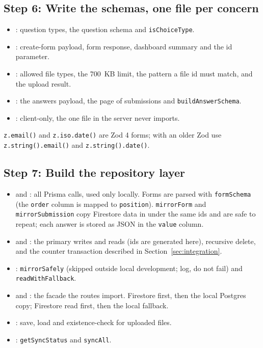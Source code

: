 \documentclass[11pt,a4paper]{article}
\begin{document}
\subsection*{Step 6: Write the schemas, one file per concern}
\begin{itemize}
  \item {}: question types, the question schema and \texttt{isChoiceType}.
  \item {}: create-form payload, form response, dashboard summary and the id parameter.
  \item {}: allowed file types, the 700~KB limit, the pattern a file id must match, and the upload result.
  \item {}: the answers payload, the page of submissions and \texttt{buildAnswerSchema}.
  \item {}: client-only, the one file in  the server never imports.
\end{itemize}
\texttt{z.email()} and \texttt{z.iso.date()} are Zod 4 forms; with an older Zod use \texttt{z.string().email()} and \texttt{z.string().date()}.

\subsection*{Step 7: Build the repository layer}
\begin{itemize}
  \item {} and : all Prisma calls, used only locally. Forms are parsed with \texttt{formSchema} (the \texttt{order} column is mapped to \texttt{position}). \texttt{mirrorForm} and \texttt{mirrorSubmission} copy Firestore data in under the same ids and are safe to repeat; each answer is stored as JSON in the \texttt{value} column.
  \item {} and : the primary writes and reads (ids are generated here), recursive delete, and the counter transaction described in Section~\ref{sec:integration}.
  \item {}: \texttt{mirrorSafely} (skipped outside local development; log, do not fail) and \texttt{readWithFallback}.
  \item {} and : the facade the routes import. Firestore first, then the local Postgres copy; Firestore read first, then the local fallback.
  \item {}: save, load and existence-check for uploaded files.
  \item {}: \texttt{getSyncStatus} and \texttt{syncAll}.
\end{itemize}
\end{document}
